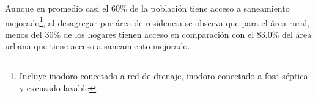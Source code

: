 Aunque en promedio casi el 60\% de la población tiene acceso a saneamiento mejorado\footnote{Incluye inodoro conectado a red de drenaje, inodoro conectado a fosa séptica y excusado lavable}, al desagregar por área de residencia se observa que para el área rural, menos del 30\% de los hogares tienen acceso en comparación con el 83.0\% del área urbana que tiene acceso a saneamiento mejorado.
